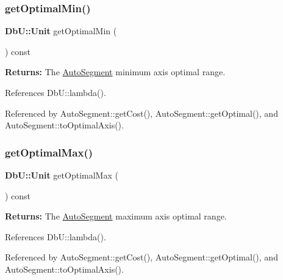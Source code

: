 \subsubsection{\texorpdfstring{get\+Optimal\+Min()}{getOptimalMin()}}
{\footnotesize\ttfamily \textbf{ Db\+U\+::\+Unit} get\+Optimal\+Min (\begin{DoxyParamCaption}{ }\end{DoxyParamCaption}) const\hspace{0.3cm}{\ttfamily [inline]}}

{\bfseries Returns\+:} The \hyperlink{classKatabatic_1_1AutoSegment}{Auto\+Segment} minimum axis optimal range. 

References Db\+U\+::lambda().



Referenced by Auto\+Segment\+::get\+Cost(), Auto\+Segment\+::get\+Optimal(), and Auto\+Segment\+::to\+Optimal\+Axis().

\mbox{\label{classKatabatic_1_1AutoSegment_a1bada13dd4460386d4bed22c1a4b3921}} 
\subsubsection{\texorpdfstring{get\+Optimal\+Max()}{getOptimalMax()}}
{\footnotesize\ttfamily \textbf{ Db\+U\+::\+Unit} get\+Optimal\+Max (\begin{DoxyParamCaption}{ }\end{DoxyParamCaption}) const\hspace{0.3cm}{\ttfamily [inline]}}

{\bfseries Returns\+:} The \hyperlink{classKatabatic_1_1AutoSegment}{Auto\+Segment} maximum axis optimal range. 

References Db\+U\+::lambda().



Referenced by Auto\+Segment\+::get\+Cost(), Auto\+Segment\+::get\+Optimal(), and Auto\+Segment\+::to\+Optimal\+Axis().

\mbox{\label{classKatabatic_1_1AutoSegment_a110201bd7c64ed78522cfb3f7b142431}} 
